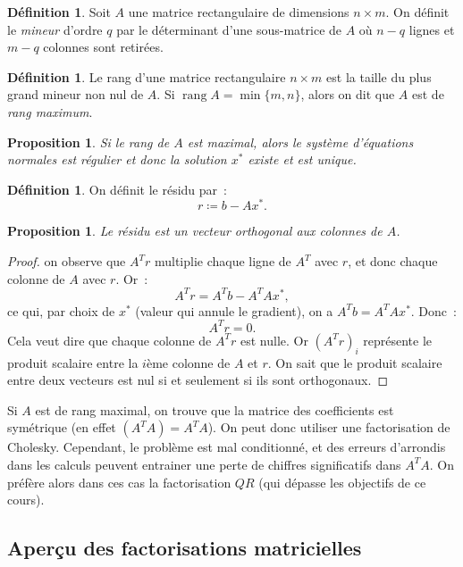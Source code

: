 \documentclass{article}
\newtheorem{prp}[thm]{Proposition}
\theoremstyle{definition}
\newtheorem{déf}[thm]{Définition}
\theoremstyle{remark}
\DeclareMathOperator{\rg}{rang}  %
\begin{document}
		\begin{déf} Soit $A$ une matrice rectangulaire de dimensions $n \times m$. On définit le \emph{mineur} d'ordre $q$ par le déterminant d'une sous-matrice
		de $A$ où $n-q$ lignes et $m-q$ colonnes sont retirées.
		\end{déf}

		\begin{déf} Le rang d'une matrice rectangulaire $n \times m$ est la taille du plus grand mineur non nul de $A$. Si $\rg A = \min\{m, n\}$, alors
		on dit que $A$ est de \emph{rang maximum}.
		\end{déf}

		\begin{prp} Si le rang de $A$ est maximal, alors le système d'équations normales est régulier et donc la solution $x^*$ existe et est unique.
		\end{prp}

		\begin{déf} On définit le résidu par~:
		\[r \coloneqq b - Ax^*.\]
		\end{déf}

		\begin{prp} Le résidu est un vecteur orthogonal aux colonnes de $A$. \end{prp}

		\begin{proof} on observe que $A^Tr$ multiplie chaque ligne de $A^T$ avec $r$, et donc chaque colonne de $A$ avec $r$. Or~:
		\[A^Tr = A^Tb - A^TAx^*,\]
		ce qui, par choix de $x^*$ (valeur qui annule le gradient), on a $A^Tb = A^TAx^*$. Donc~:
		\[A^Tr = 0.\]
		Cela veut dire que chaque colonne de $A^Tr$ est nulle. Or $(A^Tr)_i$ représente le produit scalaire entre la $i$ème colonne de $A$ et $r$.
		On sait que le produit scalaire entre deux vecteurs est nul si et seulement si ils sont orthogonaux.
		\end{proof}

		Si $A$ est de rang maximal, on trouve que la matrice des coefficients est symétrique (en effet $(A^TA) = A^TA$). On peut donc utiliser une factorisation
		de Cholesky. Cependant, le problème est mal conditionné, et des erreurs d'arrondis dans les calculs peuvent entrainer une perte de chiffres significatifs
		dans $A^TA$. On préfère alors dans ces cas la factorisation $QR$ (qui dépasse les objectifs de ce cours).

	\subsection{Aperçu des factorisations matricielles}
\end{document}
